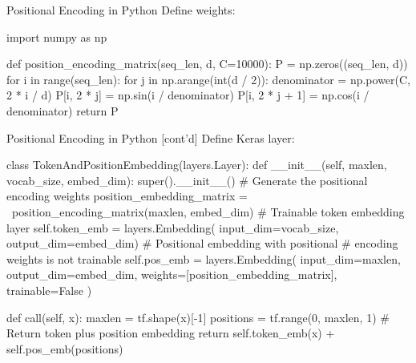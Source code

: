 \documentclass[ignorenonframetext,xcolor=x11names]{beamer}
\begin{document}
\begin{frame}[fragile]{Positional Encoding in Python}
Define weights:
\begin{pythoncode}
import numpy as np

def position_encoding_matrix(seq_len, d, C=10000):
    P = np.zeros((seq_len, d))
    for i in range(seq_len):
        for j in np.arange(int(d / 2)):
            denominator = np.power(C, 2 * i / d)
            P[i, 2 * j] = np.sin(i / denominator)
            P[i, 2 * j + 1] = np.cos(i / denominator)
    return P
\end{pythoncode}
\end{frame}

\begin{frame}[fragile]{Positional Encoding in Python \small [cont'd]}
Define Keras layer:
\begin{pythoncode}
class TokenAndPositionEmbedding(layers.Layer):
    def __init__(self, maxlen, vocab_size, embed_dim):
        super().__init__()
        # Generate the positional encoding weights
        position_embedding_matrix = \
            position_encoding_matrix(maxlen, embed_dim)
        # Trainable token embedding layer
        self.token_emb = layers.Embedding(
            input_dim=vocab_size, output_dim=embed_dim)
        # Positional embedding with positional 
        # encoding weights is not trainable
        self.pos_emb = layers.Embedding(
            input_dim=maxlen, output_dim=embed_dim,
            weights=[position_embedding_matrix],
            trainable=False
        )

    def call(self, x):
        maxlen = tf.shape(x)[-1]
        positions = tf.range(0, maxlen, 1)
        # Return token plus position embedding
        return self.token_emb(x) + self.pos_emb(positions)
\end{pythoncode}
\end{frame}
\end{document}
